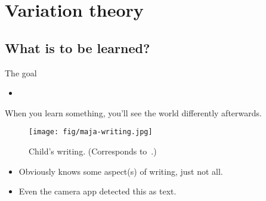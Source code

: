 \mode*

\begin{frame}
  \tableofcontents[hideallsubsections]
\end{frame}

\section{Variation theory}

\subsection{What is to be learned?}

\begin{frame}
  \begin{block}{The goal}
    \begin{itemize}
      \item {}
    \end{itemize}
  \end{block}

  \pause

  \begin{remark}
    When you learn something, you'll see the world differently afterwards.
  \end{remark}
\end{frame}

\begin{frame}
  \begin{figure}
    \texttt{[image: fig/maja-writing.jpg]}
    \caption{Child's writing.
      (Corresponds to~\cite[Fig.~2.1, p.~30]{NecessaryConditionsOfLearning}.)
    }
  \end{figure}
  \begin{example}
    \begin{itemize}
      \item Obviously knows some aspect(s) of writing, just not all.
      \item Even the camera app detected this as text.
    \end{itemize}
  \end{example}
\end{frame}

